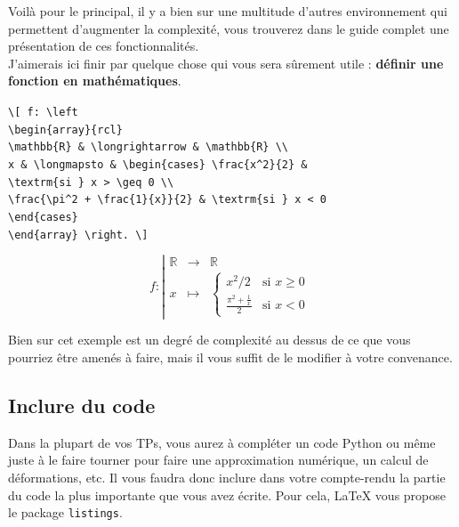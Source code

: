 \documentclass[11pt]{article}				%
\begin{document}
Voilà pour le principal, il y a bien sur une multitude d'autres environnement qui permettent d'augmenter la complexité, vous trouverez dans le guide complet une présentation de ces fonctionnalités. \\
J'aimerais ici finir par quelque chose qui vous sera sûrement utile : \textbf{définir une fonction en mathématiques}.
\begin{multicols}{2}
	
\verb|\[ f: \left | \\
\verb|\begin{array}{rcl}| \\
\verb|\mathbb{R} & \longrightarrow & \mathbb{R} \\|	\\
\verb|x & \longmapsto & \begin{cases} \frac{x^2}{2} &| \\ \verb|\textrm{si } x > \geq 0 \\| \\
\verb|\frac{\pi^2 + \frac{1}{x}}{2} & \textrm{si } x < 0 | \\ 
\verb|\end{cases}| \\
\verb|\end{array} \right. \]|
	
\columnbreak	

\[
f: \left|
\begin{array}{rcl}
	\mathbb{R} & \longrightarrow & \mathbb{R} \\
	x & \longmapsto & \begin{cases} x^2/2 & \textrm{si } x \geq 0 \\
	\frac{\pi^2 + \frac{1}{x}}{2} & \textrm{si } x < 0 \end{cases}
\end{array} \right. \]
\end{multicols}

Bien sur cet exemple est un degré de complexité au dessus de ce que vous pourriez être amenés à faire, mais il vous suffit de le modifier à votre convenance.


\clearpage
\subsection*{Inclure du code}
Dans la plupart de vos TPs, vous aurez à compléter un code Python ou même juste à le faire tourner pour faire une approximation numérique, un calcul de déformations, etc. Il vous faudra donc inclure dans votre compte-rendu la partie du code la plus importante que vous avez écrite. Pour cela, LaTeX vous propose le package \texttt{listings}.
\end{document}
